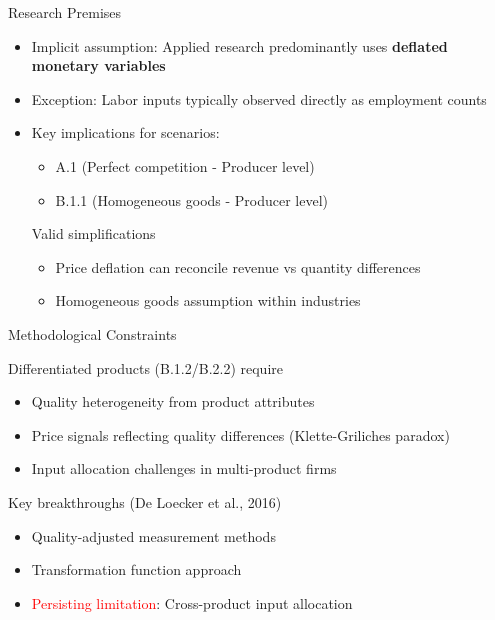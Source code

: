 \documentclass[aspectratio=169]{beamer}  %
\begin{document}
\begin{frame}{Research Premises}
\begin{itemize}
    \item Implicit assumption: Applied research predominantly uses \textbf{deflated monetary variables}
    \item Exception: Labor inputs typically observed directly as employment counts
    \item Key implications for scenarios:
    \begin{itemize}
        \item A.1 (Perfect competition - Producer level)
        \item B.1.1 (Homogeneous goods - Producer level)
    \end{itemize}
    \begin{block}{Valid simplifications}
    \begin{itemize}
        \item Price deflation can reconcile revenue vs quantity differences
        \item Homogeneous goods assumption within industries
    \end{itemize}
    \end{block}
\end{itemize}
\end{frame}

\begin{frame}{Methodological Constraints}
\begin{alertblock}{Differentiated products (B.1.2/B.2.2) require}
\begin{itemize}
    \item Quality heterogeneity from product attributes
    \item Price signals reflecting quality differences (Klette-Griliches paradox)
    \item Input allocation challenges in multi-product firms
\end{itemize}
\end{alertblock}

\begin{block}{Key breakthroughs (De Loecker et al., 2016)}
\begin{itemize}
    \item Quality-adjusted measurement methods
    \item Transformation function approach
    \item \textcolor{red}{Persisting limitation}: Cross-product input allocation
\end{itemize}
\end{block}
\end{frame}
\end{document}
